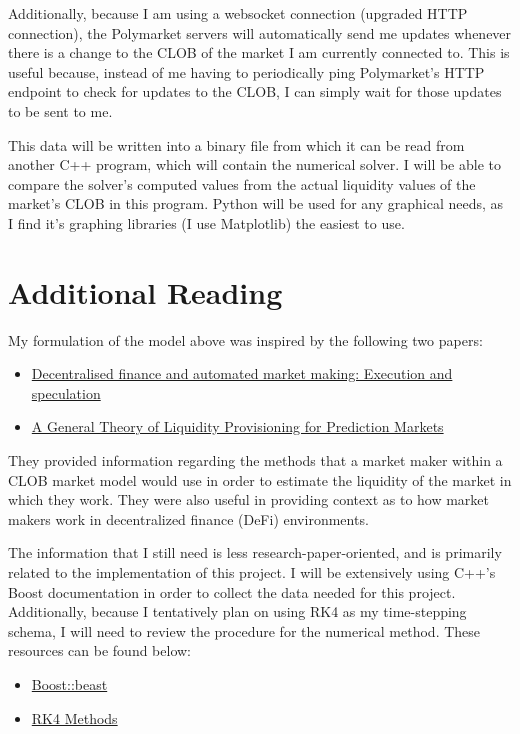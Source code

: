 \documentclass{article}
\begin{document}
Additionally, because I am using a websocket connection (upgraded HTTP connection), the Polymarket servers will automatically send me updates whenever there is a change to the CLOB of the market I am currently connected to. This is useful because, instead of me having to periodically ping Polymarket's HTTP endpoint to check for updates to the CLOB, I can simply wait for those updates to be sent to me.

This data will be written into a binary file from which it can be read from another C++ program, which will contain the numerical solver. I will be able to compare the solver's computed values from the actual liquidity values of the market's CLOB in this program. Python will be used for any graphical needs, as I find it's graphing libraries (I use Matplotlib) the easiest to use.

\section*{Additional Reading}
My formulation of the model above was inspired by the following two papers:
\begin{itemize}
    \item \href{https://www.sciencedirect.com/science/article/pii/S0165188925001009#bl0010}{Decentralised finance and automated market making: Execution and speculation}
    \item \href{https://arxiv.org/pdf/2311.08725v2}{A General Theory of Liquidity Provisioning for Prediction Markets}
\end{itemize}
They provided information regarding the methods that a market maker within a CLOB market model would use in order to estimate the liquidity of the market in which they work. They were also useful in providing context as to how market makers work in decentralized finance (DeFi) environments.

The information that I still need is less research-paper-oriented, and is primarily related to the implementation of this project. I will be extensively using C++'s Boost documentation in order to collect the data needed for this project. Additionally, because I tentatively plan on using RK4 as my time-stepping schema, I will need to review the procedure for the numerical method. These resources can be found below:
\begin{itemize}
    \item \href{https://www.boost.org/doc/libs/latest/libs/beast/doc/html/beast/introduction.html#beast.introduction.requirements}{Boost::beast}
    \item \href{https://en.wikipedia.org/wiki/Runge%E2%80%93Kutta_methods}{RK4 Methods}
\end{itemize}
\end{document}
